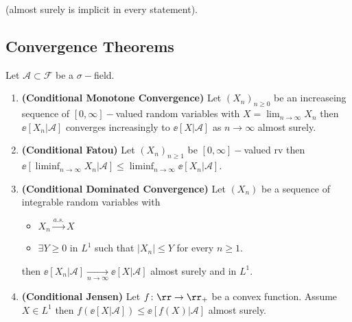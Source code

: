 \documentclass[../main.tex]{subfiles}
\begin{document}
    (almost surely is implicit in every statement).
    
    \subsection{Convergence Theorems}
    \begin{theorem}
        Let $\mathcal{A} \subset \mathcal{F}$ be a $\sigma-$field.
        \begin{enumerate}
          \item \textbf{\sffamily (Conditional Monotone Convergence)}
            Let $(X_n)_{n \geq 0}$ be an increaseing sequence of $[0, \infty]-$valued
            random variables with $X = \lim_{n \to \infty} X_n$ then $\ee[X_n | \mathcal{A}]$ 
            converges increasingly to $\ee[X | \mathcal{A}]$ as $n \to \infty$
            almost surely.

          \item \textbf{\sffamily (Conditional Fatou)}
            Let $(X_n)_{n \geq 1}$ be $[0, \infty]-$valued rv then
            $\ee[\liminf_{n \to \infty} X_n | \mathcal{A} ] \leq \liminf_{n \to
            \infty}\ee[X_n | \mathcal{A}]$.

          \item \textbf{\sffamily (Conditional Dominated Convergence)}
            Let $(X_n)$ be a sequence of integrable random variables with
            \begin{itemize}
              \item $X_n \overset{a.s.}{\longrightarrow} X$
              \item $\exists Y \geq 0$ in $L^1$ such that $|X_n| \leq Y$ for
                every $n \geq 1$.
            \end{itemize}
            then $\ee[X_n | \mathcal{A}] \underset{n \to
            \infty}{\longrightarrow} \ee[X | \mathcal{A}]$ almost surely and in
            $L^1$.

          \item \textbf{\sffamily (Conditional Jensen)}
            Let $f \colon \rr \to \rr_+$ be a convex function. Assume $X \in L^1$
            then $f(\ee[X | \mathcal{A}]) \leq \ee[f(X) | \mathcal{A}]$ almost
            surely.

        \end{enumerate}
    \end{theorem}
\end{document}
